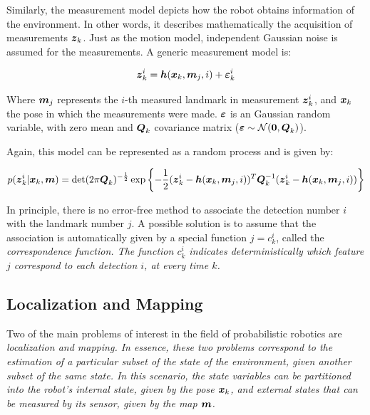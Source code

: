 Similarly, the measurement model depicts how the robot obtains information of the environment. In other words, it describes mathematically the acquisition of measurements $\boldsymbol{z}_k$. Just as the motion model, independent Gaussian noise is assumed for the measurements. A generic measurement model is:

\begin{equation}
\boldsymbol{z}_k^i = \boldsymbol{h}(\boldsymbol{x}_k,\boldsymbol{m}_j,i) + \boldsymbol{\varepsilon}_k^i
\label{eq:measurement-model}
\end{equation} 

\noindent
Where $\boldsymbol{m}_j$ represents the $i$-th measured landmark in measurement $\boldsymbol{z}_k^i$, and $\boldsymbol{x}_k$ the pose in which the measurements were made. $\boldsymbol{\varepsilon}$ is an Gaussian random variable, with zero mean and $\boldsymbol{Q}_k$ covariance matrix ($\boldsymbol{\varepsilon} \sim \mathcal{N}(\boldsymbol{0},\boldsymbol{Q}_k)$).

Again, this model can be represented as a random process and is given by:

\begin{equation}
p(\boldsymbol{z}_k^i|\boldsymbol{x}_k,\boldsymbol{m}) = \det(2\pi \boldsymbol{Q}_k)^{-\frac{1}{2}}\exp\left\lbrace -\frac{1}{2}(\boldsymbol{z}_k^i-\boldsymbol{h}(\boldsymbol{x}_k,\boldsymbol{m}_j,i))^T
\boldsymbol{Q}_k^{-1}(\boldsymbol{z}_k^i-\boldsymbol{h}(\boldsymbol{x}_k,\boldsymbol{m}_j,i))\right\rbrace 
\label{eq:measure-pdf}
\end{equation}

In principle, there is no error-free method to associate the detection number $i$ with the landmark number $j$. A possible solution is to assume that the association is automatically given by a special function $j=c_k^i$, called the \it{correspondence function}. The function $c_k^i$ indicates deterministically which feature $j$ correspond to each detection $i$, at every time $k$.

\subsection{Localization and Mapping}

Two of the main problems of interest in the field of probabilistic robotics are \it{localization} and \it{mapping}. In essence, these two problems correspond to the estimation of a particular subset of the state of the environment, given another subset of the same state. In this scenario, the state variables can be partitioned into the robot's internal state, given by the pose $\boldsymbol{x}_k$, and external states that can be measured by its sensor, given by the map $\boldsymbol{m}$.

